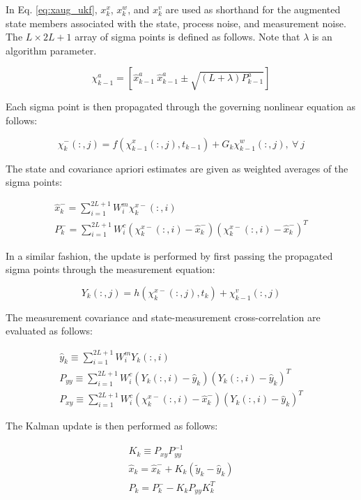 \documentclass[]{article}
\begin{document}
In Eq. \ref{eq:xaug_ukf}, $x^x_k$, $x^w_k$, and $x^v_k$ are used as shorthand for the augmented state members associated with the state, process noise, and measurement noise. The $L \times 2L+1$ array of sigma points is defined as follows. Note that $\lambda$ is an algorithm parameter.

\begin{equation}
\chi^a_{k-1} = [\hat{x}^a_{k-1} \ \hat{x}^a_{k-1}\pm \sqrt{(L+\lambda)P_{k-1}^a}]
\end{equation}

Each sigma point is then propagated through the governing nonlinear equation as follows:

\begin{equation}
\chi^-_{k}(:,j) = f(\chi^x_{k-1}(:,j),t_{k-1}) + G_k \chi^w_{k-1}(:,j), \ \forall \ j
\label{eq:ukf_prop}
\end{equation}

The state and covariance apriori estimates are given as weighted averages of the sigma points:

\begin{align}
\hat{x}_k^- = \sum_{i=1}^{2L+1} W_i^m \chi^{x-}_k(:,i) \\
P_k^- = \sum_{i=1}^{2L+1} W_i^c (\chi^{x-}_k(:,i)-\hat{x}_k^-)(\chi^{x-}_k(:,i)-\hat{x}_k^-)^T
\end{align}

In a similar fashion, the update is performed by first passing the propagated sigma points through the measurement equation:

\begin{equation}
Y_k(:,j) = h(\chi^{x-}_k(:,j),t_k) + \chi^v_{k-1}(:,j)
\label{eq:ukf_expectation}
\end{equation}

The measurement covariance and state-measurement cross-correlation are evaluated as follows:

\begin{align}
\hat{y}_k \equiv \sum_{i=1}^{2L+1} W_i^m Y_k(:,i) \\
P_{yy} \equiv \sum_{i=1}^{2L+1} W_i^c (Y_k(:,i)-\hat{y}_k)(Y_k(:,i)-\hat{y}_k)^T \\
P_{xy} \equiv \sum_{i=1}^{2L+1} W_i^c (\chi^{x-}_k(:,i)-\hat{x}_k^-)(Y_k(:,i)-\hat{y}_k)^T
\end{align}

The Kalman update is then performed as follows:

\begin{align}
K_k \equiv P_{xy} P_{yy}^{-1} \\
\hat{x}_k = \hat{x}_k^- + K_k(\tilde{y}_k - \hat{y}_k) \\
P_k = P_k^- - K_kP_{yy}K_k^T
\label{eq:ukf_end}
\end{align}
\end{document}
